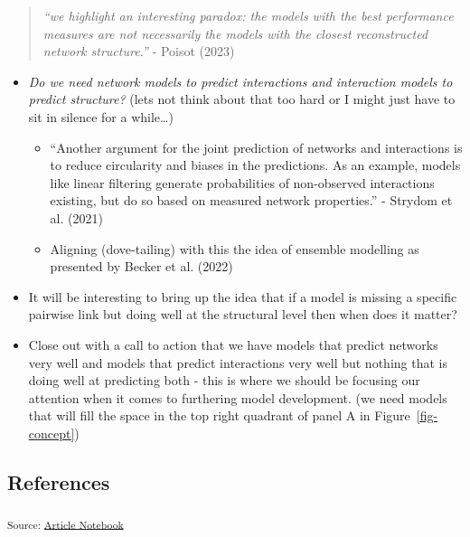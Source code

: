 \documentclass[
]{agujournal2019}
\begin{document}
\begin{quote}
\emph{``we highlight an interesting paradox: the models with the best
performance measures are not necessarily the models with the closest
reconstructed network structure.''} - Poisot (2023)
\end{quote}

\begin{itemize}
\item
  \emph{Do we need network models to predict interactions and
  interaction models to predict structure?} (lets not think about that
  too hard or I might just have to sit in silence for a while\ldots)

  \begin{itemize}
  \item
    ``Another argument for the joint prediction of networks and
    interactions is to reduce circularity and biases in the predictions.
    As an example, models like linear filtering generate probabilities
    of non-observed interactions existing, but do so based on measured
    network properties.'' - Strydom et al. (2021)
  \item
    Aligning (dove-tailing) with this the idea of ensemble modelling as
    presented by Becker et al. (2022)
  \end{itemize}
\item
  It will be interesting to bring up the idea that if a model is missing
  a specific pairwise link but doing well at the structural level then
  when does it matter?
\item
  Close out with a call to action that we have models that predict
  networks very well and models that predict interactions very well but
  nothing that is doing well at predicting both - this is where we
  should be focusing our attention when it comes to furthering model
  development. (we need models that will fill the space in the top right
  quadrant of panel A in Figure~\ref{fig-concept})
\end{itemize}

\subsection*{References}\label{references}

\vspace{1em}

\textsubscript{Source:
\href{https://BecksLab.github.io/ms_t_is_for_topology/index.qmd.html}{Article
Notebook}}
\end{document}
